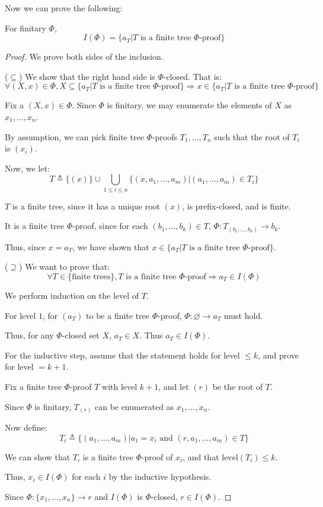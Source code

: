 \documentclass[12pt]{article}
\begin{document}
Now we can prove the following:
\begin{theorem}
	For finitary $\Phi$,
	\[I(\Phi)=\{a_T|T\text{ is a finite tree }\Phi\text{-proof}\}\]
\end{theorem}
\begin{proof}
	We prove both sides of the inclusion.

	\noindent($\subseteq$)
	We show that the right hand side is $\Phi$-closed. That is:
	\[\forall (X,x)\in\Phi,X\subseteq\{a_T|T\text{ is a finite tree }\Phi\text{-proof}\}\Rightarrow x\in\{a_T|T\text{ is a finite tree }\Phi\text{-proof}\}\]

	Fix a $(X,x)\in\Phi$. Since $\Phi$ is finitary, we may enumerate the elements of $X$ as $x_1,\dots,x_n$.

	By assumption, we can pick finite tree $\Phi$-proofs $T_1,\dots,T_n$ such that the root of $T_i$ is $(x_i)$.

	Now, we let:
	\[T\triangleq\{(x)\}\cup\bigcup_{1\le i\le n}\{(x,a_1,\dots,a_m)|(a_1,\dots,a_m)\in T_i\}\]

	$T$ is a finite tree, since it has a unique root $(x)$, is prefix-closed, and is finite.

	It is a finite tree $\Phi$-proof, since for each $(b_1,\dots,b_k)\in T$, $\Phi:T_{(b_1,\dots,b_k)}\rightarrow b_k$.

	Thus, since $x=a_T$, we have shown that $x\in\{a_T|T\text{ is a finite tree }\Phi\text{-proof}\}$.

	\noindent($\supseteq$)
	We want to prove that:
	\[\forall T\in\{\text{finite trees}\},T\text{ is a finite tree }\Phi\text{-proof}\Rightarrow a_T\in I(\Phi)\]

	We perform induction on the level of $T$.

	For level $1$, for $(a_T)$ to be a finite tree $\Phi$-proof, $\Phi:\varnothing\rightarrow a_T$ must hold.

	Thus, for any $\Phi$-closed set $X$, $a_T\in X$. Thus $a_T\in I(\Phi)$.

	For the inductive step, assume that the statement holds for level $\le k$, and prove for level $=k+1$.

	Fix a finite tree $\Phi$-proof $T$ with level $k+1$, and let $(r)$ be the root of $T$.

	Since $\Phi$ is finitary, $T_{(r)}$ can be enumerated as $x_1,\dots,x_n$.

	Now define:
	\[T_i\triangleq\{(a_1,\dots,a_m)|a_1=x_i\text{ and }(r,a_1,\dots,a_m)\in T\}\]

	We can show that $T_i$ is a finite tree $\Phi$-proof of $x_i$, and that $\text{level}(T_i)\le k$.

	Thus, $x_i\in I(\Phi)$ for each $i$ by the inductive hypothesis.

	Since $\Phi:\{x_1,\dots,x_n\}\rightarrow r$ and $I(\Phi)$ is $\Phi$-closed, $r\in I(\Phi)$.
\end{proof}
\clearpage
\end{document}
